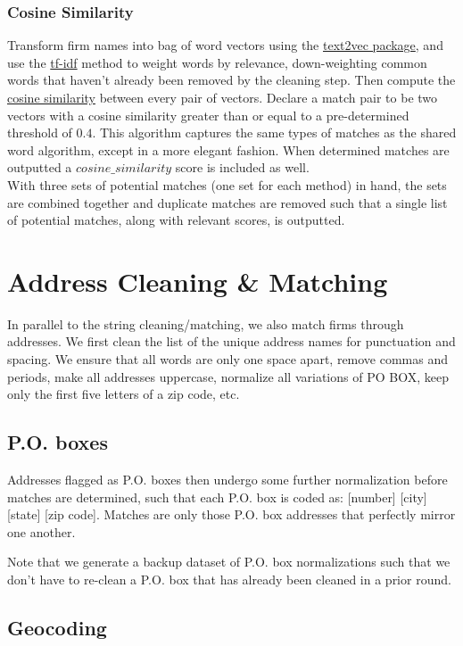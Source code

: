 \documentclass{article}
\begin{document}
\subsubsection{Cosine Similarity}
Transform firm names into bag of word vectors using the \href{http://text2vec.org/}{text2vec package}, and use the \href{https://en.wikipedia.org/wiki/Tf\%E2\%80\%93idf}{tf-idf} method to weight words by relevance, down-weighting common words that haven't already been removed by the cleaning step. Then compute the \href{https://en.wikipedia.org/wiki/Cosine_similarity}{cosine similarity} between every pair of vectors. Declare a match pair to be two vectors with a cosine similarity greater than or equal to a pre-determined threshold of $0.4$. This algorithm captures the same types of matches as the shared word algorithm, except in a more elegant fashion. When determined matches are outputted a $cosine\_similarity$ score is included as well. \\

With three sets of potential matches (one set for each method) in hand, the sets are combined together and duplicate matches are removed such that a single list of potential matches, along with relevant scores, is outputted.

\section{Address Cleaning \& Matching}

In parallel to the string cleaning/matching, we also match firms through addresses. 
We first clean the list of the unique address names for punctuation and spacing. We ensure that all words are only one space apart, remove commas and periods, make all addresses uppercase, normalize all variations of PO BOX, keep only the first five letters of a zip code, etc.

\subsection{P.O. boxes}
Addresses flagged as P.O. boxes then undergo some further normalization before matches are determined, such that each P.O. box is coded as: [number] [city] [state] [zip code]. Matches are only those P.O. box addresses that perfectly mirror one another. 

Note that we generate a backup dataset of P.O. box normalizations such that we don't have to re-clean a P.O. box that has already been cleaned in a prior round. 
\subsection{Geocoding}
\end{document}
